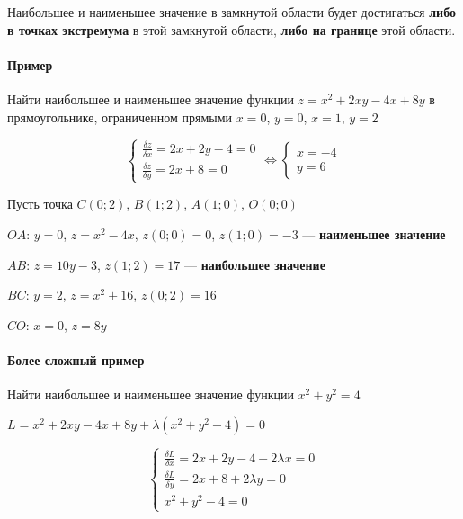 \documentclass{article}
\begin{document}
\begin{flushleft}

Наибольшее и наименьшее значение в замкнутой области будет достигаться \textbf{либо в точках экстремума} в этой замкнутой области, \textbf{либо на границе} этой области.

\paragraph{Пример} Найти наибольшее и наименьшее значение функции $z = x^2 + 2 x y - 4 x + 8 y$ в прямоугольнике, ограниченном прямыми $x = 0$, $y = 0$, $x = 1$, $y = 2$

\begin{equation}
\begin{cases}
    \frac{\delta z}{\delta x} = 2x + 2y - 4 = 0 \\
    \frac{\delta z}{\delta y} = 2x + 8 = 0
\end{cases} \Longleftrightarrow
\begin{cases}
    x = -4 \\
    y = 6
\end{cases}
\end{equation}

Пусть точка $C(0; 2)$, $B(1; 2)$, $A(1; 0)$, $O(0; 0)$

\hfill

$OA$: $y = 0$, $z = x^2 - 4x$, $z(0; 0) = 0$, $z(1; 0) = -3$ — \textbf{наименьшее значение}

$AB$: $z = 10y - 3$, $z(1; 2) = 17$ — \textbf{наибольшее значение}

$BC$: $y = 2$, $z = x^2 + 16$, $z(0; 2) = 16$

$CO$: $x = 0$, $z = 8y$

\paragraph{Более сложный пример} Найти наибольшее и наименьшее значение функции $x^2 + y^2 = 4$

$L = x^2 + 2xy - 4x + 8y + \lambda (x^2 + y^2 - 4) = 0$

\begin{equation}
\begin{cases}
    \frac{\delta L}{\delta x} = 2x + 2y - 4 + 2 \lambda x = 0 \\
    \frac{\delta L}{\delta y} = 2x + 8 + 2 \lambda y = 0 \\
    x^2 + y^2 - 4 = 0
\end{cases}
\end{equation}

\end{flushleft}
\end{document}
